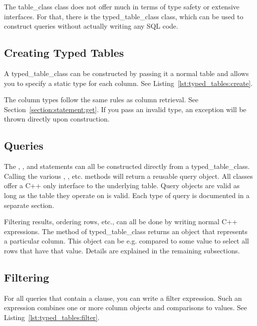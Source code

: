 The \gls{table_class} class does not offer much in terms of type safety or extensive interfaces. For that, there is the \gls{typed_table_class} class, which can be used to construct queries without actually writing any SQL code.

\subsection{Creating Typed Tables}
\label{section:typed_tables:create}

A \gls{typed_table_class} can be constructed by passing it a normal table and allows you to specify a static type for each column. See Listing~\ref{lst:typed_tables:create}.



The column types follow the same rules as column retrieval. See Section~\ref{section:statement:get}. If you pass an invalid type, an exception will be thrown directly upon construction.

\subsection{Queries}
\label{section:typed_tables:queries}

The , ,  and  statements can all be constructed directly from a \gls{typed_table_class}. Calling the various , , etc. methods will return a reusable query object. All classes offer a C++ only interface to the underlying table. Query objects are valid as long as the table they operate on is valid. Each type of query is documented in a separate section.

Filtering results, ordering rows, etc., can all be done by writing normal C++ expressions. The  method of \gls{typed_table_class} returns an object that represents a particular column. This object can be e.g. compared to some value to select all rows that have that value. Details are explained in the remaining subsections.

\subsection{Filtering}

For all queries that contain a  clause, you can write a filter expression. Such an expression combines one or more column objects and comparisons to values. See Listing~\ref{lst:typed_tables:filter}.

